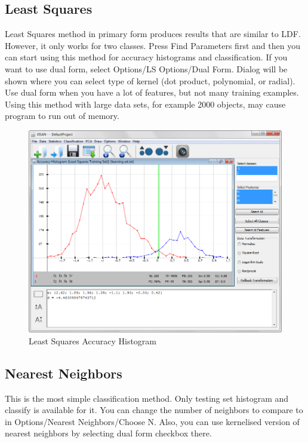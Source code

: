 \documentclass[a4paper,12pt,english]{report}
\begin{document}
\newpage
\subsection*{Least Squares}
Least Squares method in primary form produces results that are similar to LDF. However, it only works for two classes. Press Find Parameters first and then you can start using this method for accuracy histograms and classification. If you want to use dual form, select Options/LS Options/Dual Form. Dialog will be shown where you can select type of kernel (dot product, polynomial, or radial). Use dual form when you have a lot of features, but not many training examples. Using this method with large data sets, for example 2000 objects, may cause program to run out of memory.

\begin{figure}[htb]
\centering
\includegraphics[width=360pt]{s17.png}
\caption{Least Squares Accuracy Histogram}
\end{figure}


\subsection*{Nearest Neighbors}
This is the most simple classification method. Only testing set histogram and classify is available for it. You can change the number of neighbors to compare to in Options/Nearest Neighbors/Choose N. Also, you can use kernelised version of nearest neighbors by selecting dual form checkbox there. 
\newpage
\end{document}
